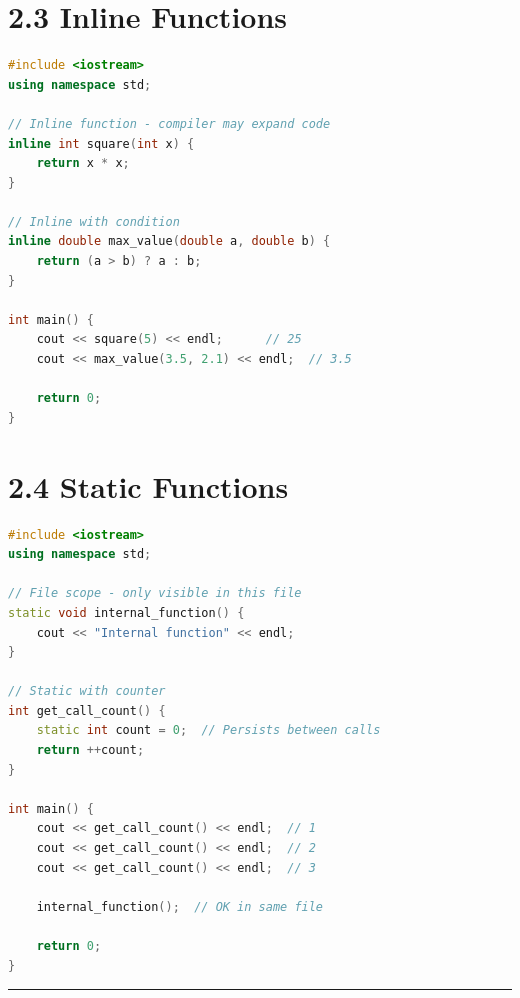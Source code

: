 \hypertarget{inline-functions}{%
\section{2.3 Inline Functions}\label{inline-functions}}

\begin{lstlisting}[language={C++}]
#include <iostream>
using namespace std;

// Inline function - compiler may expand code
inline int square(int x) {
    return x * x;
}

// Inline with condition
inline double max_value(double a, double b) {
    return (a > b) ? a : b;
}

int main() {
    cout << square(5) << endl;      // 25
    cout << max_value(3.5, 2.1) << endl;  // 3.5
    
    return 0;
}
\end{lstlisting}

\hypertarget{static-functions}{%
\section{2.4 Static Functions}\label{static-functions}}

\begin{lstlisting}[language={C++}]
#include <iostream>
using namespace std;

// File scope - only visible in this file
static void internal_function() {
    cout << "Internal function" << endl;
}

// Static with counter
int get_call_count() {
    static int count = 0;  // Persists between calls
    return ++count;
}

int main() {
    cout << get_call_count() << endl;  // 1
    cout << get_call_count() << endl;  // 2
    cout << get_call_count() << endl;  // 3
    
    internal_function();  // OK in same file
    
    return 0;
}
\end{lstlisting}

\begin{center}\rule{0.5\linewidth}{0.5pt}\end{center}
